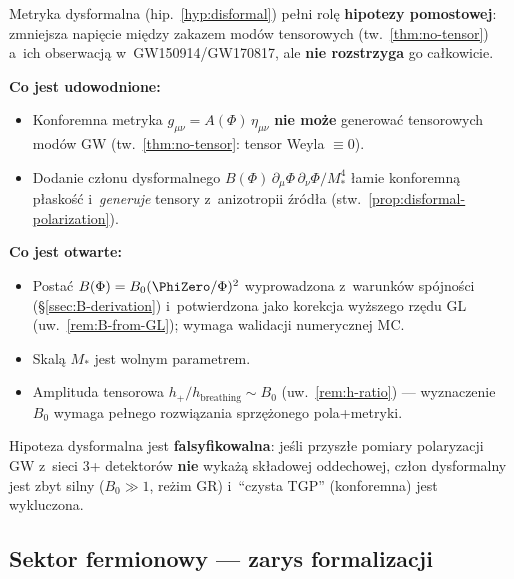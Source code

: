 \begin{remark}%
\label{rem:disformal-bridge}
Metryka dysformalna (hip.~\ref{hyp:disformal}) pe\l{}ni rol\k{e}
\textbf{hipotezy pomostowej}: zmniejsza napi\k{e}cie mi\k{e}dzy
zakazem mod\'ow tensorowych (tw.~\ref{thm:no-tensor}) a~ich
obserwacj\k{a} w~GW150914/GW170817, ale \textbf{nie rozstrzyga}
go ca\l{}kowicie.

\medskip\noindent
\textbf{Co jest udowodnione:}
\begin{itemize}[nosep]
  \item Konforemna metryka $g_{\mu\nu} = A(\Phi)\,\eta_{\mu\nu}$
    \textbf{nie mo\.ze} generowa\'c tensorowych mod\'ow GW
    (tw.~\ref{thm:no-tensor}: tensor Weyla $\equiv 0$).
  \item Dodanie cz\l{}onu dysformalnego
    $B(\Phi)\,\partial_\mu\Phi\,\partial_\nu\Phi / M_*^4$
    \l{}amie konforemn\k{a} p\l{}asko\'s\'c i~\emph{generuje}
    tensory z~anizotropii \'zr\'od\l{}a
    (stw.~\ref{prop:disformal-polarization}).
\end{itemize}

\medskip\noindent
\textbf{Co jest otwarte:}
\begin{itemize}[nosep]
  \item Posta\'c $B(\Phi) = B_0(\PhiZero/\Phi)^2$ wyprowadzona
    z~warunk\'ow sp\'ojno\'sci (\S\ref{ssec:B-derivation})
    i~potwierdzona jako korekcja wy\.zszego rz\k{e}du GL
    (uw.~\ref{rem:B-from-GL}); wymaga walidacji numerycznej MC.
  \item Skal\k{a} $M_*$ jest wolnym parametrem.
  \item Amplituda tensorowa $h_+/h_{\mathrm{breathing}}
    \sim B_0$ (uw.~\ref{rem:h-ratio}) --- wyznaczenie
    $B_0$ wymaga pe\l{}nego rozwi\k{a}zania sprz\k{e}\.zonego
    pola+metryki.
\end{itemize}
Hipoteza dysformalna jest \textbf{falsyfikowalna}:
je\'sli przysz\l{}e pomiary polaryzacji GW z~sieci
3+ detektor\'ow \textbf{nie} wyka\.z\k{a} sk\l{}adowej
oddechowej, cz\l{}on dysformalny jest zbyt silny
($B_0 \gg 1$, re\.zim GR) i~``czysta TGP'' (konforemna)
jest wykluczona.
\end{remark}

\subsection{Sektor fermionowy --- zarys formalizacji}\label{ssec:fermiony}

